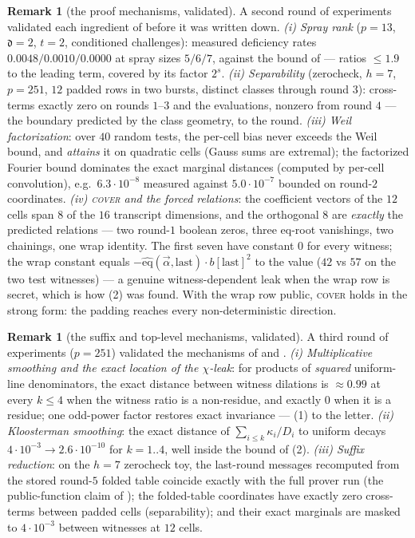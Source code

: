 \documentclass{article}
\newcommand{\extdeg}{\mathfrak{d}}
\newcommand{\eqf}{\widehat{\mathrm{eq}}}
\theoremstyle{definition}
\newtheorem{remark}[theorem]{Remark}
\begin{document}
\begin{remark}[the proof mechanisms, validated]\label{rem:numD}
A second round of experiments validated each ingredient of  before it was written down.
\emph{(i) Spray rank} ($p = 13$, $\extdeg = 2$, $t = 2$, conditioned challenges): measured deficiency rates $0.0048 / 0.0010 / 0.0000$ at spray sizes $5/6/7$, against the bound of  --- ratios $\leq 1.9$ to the leading term, covered by its factor $2^s$.
\emph{(ii) Separability} (zerocheck, $h = 7$, $p = 251$, $12$ padded rows in two bursts, distinct classes through round $3$): cross-terms exactly zero on rounds $1$--$3$ and the evaluations, nonzero from round $4$ --- the boundary predicted by the class geometry, to the round.
\emph{(iii) Weil factorization}: over $40$ random tests, the per-cell bias never exceeds the Weil bound, and \emph{attains} it on quadratic cells (Gauss sums are extremal); the factorized Fourier bound dominates the exact marginal distances (computed by per-cell convolution), e.g.\ $6.3 \cdot 10^{-8}$ measured against $5.0 \cdot 10^{-7}$ bounded on round-$2$ coordinates.
\emph{(iv) \textsc{cover} and the forced relations}: the coefficient vectors of the $12$ cells span $8$ of the $16$ transcript dimensions, and the orthogonal $8$ are \emph{exactly} the predicted relations --- two round-$1$ boolean zeros, three eq-root vanishings, two chainings, one wrap identity. The first seven have constant $0$ for every witness; the wrap constant equals $-\eqf(\vec\alpha, \mathrm{last}) \cdot b[\mathrm{last}]^2$ to the value ($42$ vs $57$ on the two test witnesses) --- a genuine witness-dependent leak when the wrap row is secret, which is how (2) was found. With the wrap row public, \textsc{cover} holds in the strong form: the padding reaches every non-deterministic direction.
\end{remark}

\begin{remark}[the suffix and top-level mechanisms, validated]\label{rem:numE}
A third round of experiments ($p = 251$) validated the mechanisms of  and .
\emph{(i) Multiplicative smoothing and the exact location of the $\chi$-leak}: for products of \emph{squared} uniform-line denominators, the exact distance between witness dilations is $\approx 0.99$ at every $k \leq 4$ when the witness ratio is a non-residue, and exactly $0$ when it is a residue; one odd-power factor restores exact invariance --- (1) to the letter.
\emph{(ii) Kloosterman smoothing}: the exact distance of $\sum_{i \leq k} \kappa_i / D_i$ to uniform decays $4 \cdot 10^{-3} \to 2.6 \cdot 10^{-10}$ for $k = 1..4$, well inside the bound of (2).
\emph{(iii) Suffix reduction}: on the $h = 7$ zerocheck toy, the last-round messages recomputed from the stored round-$5$ folded table coincide exactly with the full prover run (the public-function claim of ); the folded-table coordinates have exactly zero cross-terms between padded cells (separability); and their exact marginals are masked to $4 \cdot 10^{-3}$ between witnesses at $12$ cells.
\end{remark}
\end{document}
